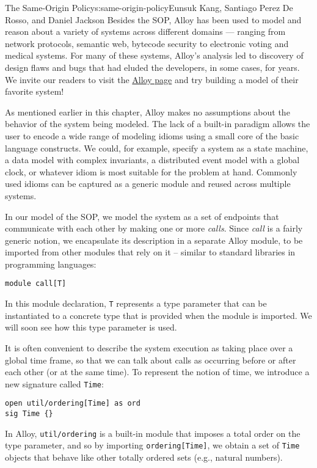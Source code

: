 \begin{aosachapter}{The Same-Origin Policy}{s:same-origin-policy}{Eunsuk Kang, Santiago Perez De Rosso, and Daniel Jackson}
Besides the SOP, Alloy has been used to model and reason about a variety
of systems across different domains --- ranging from network protocols,
semantic web, bytecode security to electronic voting and medical
systems. For many of these systems, Alloy's analysis led to discovery of
design flaws and bugs that had eluded the developers, in some cases, for
years. We invite our readers to visit the
\href{http://alloy.mit.edu}{Alloy page} and try building a model of
their favorite system!

\label{appendix-reusing-modules-in-alloy}

As mentioned earlier in this chapter, Alloy makes no assumptions about
the behavior of the system being modeled. The lack of a built-in
paradigm allows the user to encode a wide range of modeling idioms using
a small core of the basic language constructs. We could, for example,
specify a system as a state machine, a data model with complex
invariants, a distributed event model with a global clock, or whatever
idiom is most suitable for the problem at hand. Commonly used idioms can
be captured as a generic module and reused across multiple systems.

In our model of the SOP, we model the system as a set of endpoints that
communicate with each other by making one or more \emph{calls}. Since
\emph{call} is a fairly generic notion, we encapsulate its description
in a separate Alloy module, to be imported from other modules that rely
on it -- similar to standard libraries in programming languages:

\begin{verbatim}
module call[T] 
\end{verbatim}

In this module declaration, \texttt{T} represents a type parameter that
can be instantiated to a concrete type that is provided when the module
is imported. We will soon see how this type parameter is used.

It is often convenient to describe the system execution as taking place
over a global time frame, so that we can talk about calls as occurring
before or after each other (or at the same time). To represent the
notion of time, we introduce a new signature called \texttt{Time}:

\begin{verbatim}
open util/ordering[Time] as ord
sig Time {}
\end{verbatim}

In Alloy, \texttt{util/ordering} is a built-in module that imposes a
total order on the type parameter, and so by importing
\texttt{ordering{[}Time{]}}, we obtain a set of \texttt{Time} objects
that behave like other totally ordered sets (e.g., natural numbers).


\end{aosachapter}
